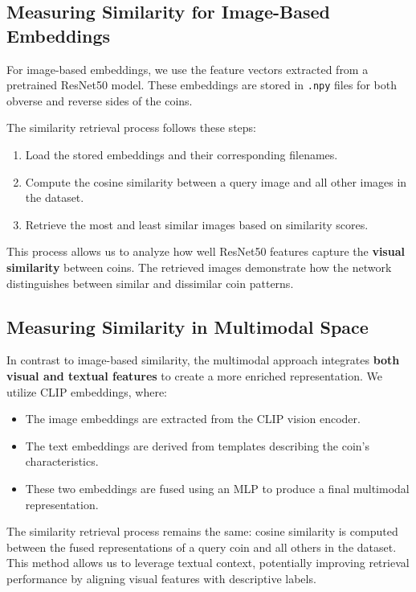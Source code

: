 \documentclass[nolibertine, english, algorithm, nomencl, minted]{ttlab-qualify}
\begin{document}
\subsection{Measuring Similarity for Image-Based Embeddings}
For image-based embeddings, we use the feature vectors extracted from a pretrained ResNet50 model. 
These embeddings are stored in \texttt{.npy} files for both obverse and reverse sides of the coins. 

The similarity retrieval process follows these steps:
\begin{enumerate}
    \item Load the stored embeddings and their corresponding filenames.
    \item Compute the cosine similarity between a query image and all other images in the dataset.
    \item Retrieve the most and least similar images based on similarity scores.
\end{enumerate}

This process allows us to analyze how well ResNet50 features capture the \textbf{visual similarity} between coins. 
The retrieved images demonstrate how the network distinguishes between similar and dissimilar coin patterns.

\subsection{Measuring Similarity in Multimodal Space}
In contrast to image-based similarity, the multimodal approach integrates \textbf{both visual and textual features} 
to create a more enriched representation. We utilize CLIP embeddings, where:
\begin{itemize}
    \item The image embeddings are extracted from the CLIP vision encoder.
    \item The text embeddings are derived from templates describing the coin's characteristics.
    \item These two embeddings are fused using an MLP to produce a final multimodal representation.
\end{itemize}

The similarity retrieval process remains the same: cosine similarity is computed between the fused representations of a 
query coin and all others in the dataset. This method allows us to leverage textual context, potentially improving retrieval 
performance by aligning visual features with descriptive labels.
\end{document}
